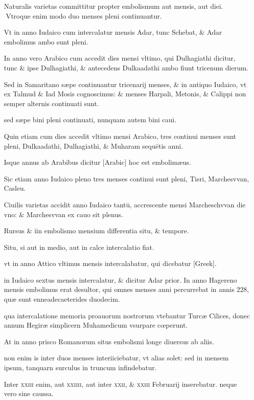 \begin{parnumbers}

Naturalis varietas committitur propter embolismum  aut mensis, aut diei.
Vtroque enim modo duo menses pleni continuantur.

Vt in anno Iudaico cum intercalatur mensis Adar, tunc Schebat, \& Adar embolimus ambo sunt pleni.

In anno vero Arabico cum accedit dies mensi vltimo, qui Dulhagiathi dicitur, tunc \& ipse Dulhagiathi, \& antecedens Dulkaadathi ambo fiunt tricenum dierum.

Sed in Samaritano sæpe continuantur tricenarij menses, \& in antiquo Iudaico, vt ex Talmud \& Iad Mosis cognoscimus: \& menses Harpali, Metonis, \& Calippi non semper alternis continuati sunt.

sed sæpe bini pleni continuati, nunquam autem bini caui.

Quin etiam cum dies accedit vltimo mensi Arabico, tres continui menses sunt pleni, Dulkaadathi, Dulhagiathi, \& Muharam sequētis anni.

Isque annus ab Arabibus dicitur \textarabic{[Arabic]} hoc est embolimæus.

Sic etiam anno Iudaico pleno tres menses continui sunt pleni, Tisri, Marchesvvan, Casleu.

Ciuilis varietas accidit anno Iudaico tantū, accrescente mensi Marcheschvvan die vno: \& Marchesvvan ex cauo sit plenus.

Rursus \& iin embolismo mensium differentia situ, \& tempore.

Situ, si aut in medio, aut in calce intercalatio fiat.

vt in anno Attico vltimus mensis intercalabatur, qui dicebatur \textgreek{[Greek]}.

in Iudaico sextus mensis intercalatur, \& dicitur Adar prior. In anno Hagereno mensis embolimus erat desultor, qui omnes menses anni percurrebat in annis 228, quæ sunt enneadecaeterides duodecim.

qua intercalatione memoria proauorum nostrorum vtebantur Turcæ Cilices, donec annum Hegiræ simplicern  Muhamedicum vsurpare cœperunt.

At in anno prisco Romanorum situs embolismi longe diuersus ab aliis.

non enim is inter duos menses interiiciebatur, vt alias solet: sed in mensem ipsum, tanquarn surculus in truncum infindebatur.

Inter \textsc{xxiii} enim, aut \textsc{xxiiii}, aut inter \textsc{xxii}, \& \textsc{xxiii} Februarij inserebatur. neque vero sine caussa.


\end{parnumbers}

